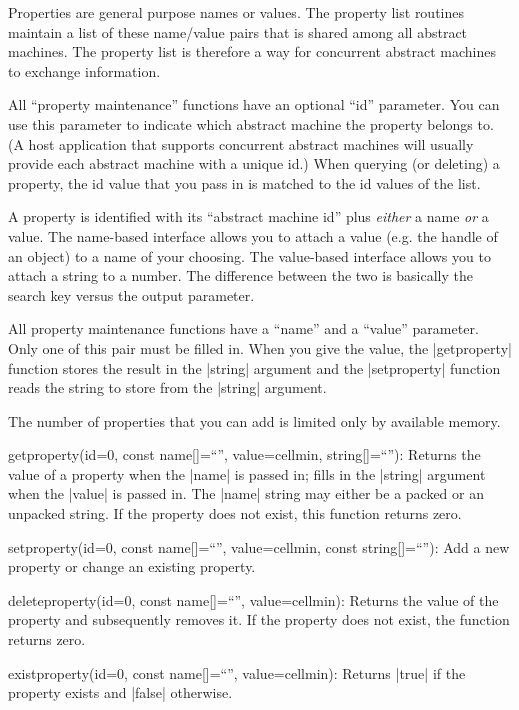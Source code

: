\dingbatseparator

Properties are general purpose names or values. The property list routines
maintain a list of these name/value pairs that is shared among all abstract
machines. The property list is therefore a way for concurrent abstract machines
to exchange information.

All ``property maintenance'' functions have an optional ``id'' parameter. You
can use this parameter to indicate which abstract machine the property belongs
to. (A host application that supports concurrent abstract machines will usually
provide each abstract machine with a unique id.) When querying (or deleting) a
property, the id value that you pass in is matched to the id values of the
list.

A property is identified with its ``abstract machine id'' plus {\it either\/}
a name {\it or\/} a value. The name-based interface allows you to attach a value
(e.g. the handle of an object) to a name of your choosing. The value-based
interface allows you to attach a string to a number. The difference between
the two is basically the search key versus the output parameter.

All property maintenance functions have a ``name'' and a ``value'' parameter.
Only one of this pair must be filled in. When you give the value, the
|getproperty| function stores the result in the |string| argument and the
|setproperty| function reads the string to store from the |string| argument.

The number of properties that you can add is limited only by available memory.

\item getproperty(id=0, const name[]=``'', value=cellmin, string[]=``''):
  Returns the value of a property when the |name| is passed in; fills in the
  |string| argument when the |value| is passed in. The |name| string may
  either be a packed or an unpacked string. If the property does not exist,
  this function returns zero.
\item setproperty(id=0, const name[]=``'', value=cellmin, const string[]=``''):
  Add a new property or change an existing property.
\item deleteproperty(id=0, const name[]=``'', value=cellmin):
  Returns the value of the property and subsequently removes it. If the
  property does not exist, the function returns zero.
\item existproperty(id=0, const name[]=``'', value=cellmin):
  Returns |true| if the property exists and |false| otherwise.
\endlist


